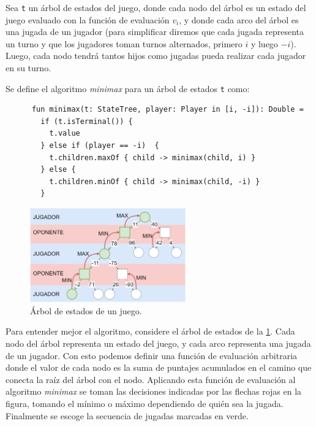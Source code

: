   \begin{definition}
    Sea \texttt{t} un árbol de estados del juego, donde cada nodo del árbol es un estado del juego
    evaluado con la función de evaluación \(v_i\), y donde cada arco del árbol es una jugada de un
    jugador (para simplificar diremos que cada jugada representa un turno y que los jugadores 
    toman turnos alternados, primero \(i\) y luego \(-i\)).
    Luego, cada nodo tendrá tantos hijos como jugadas pueda realizar cada jugador en su turno.

    Se define el algoritmo \textit{minimax} para un árbol de estados \texttt{t} como:
    
    \begin{verbatim}
      fun minimax(t: StateTree, player: Player in [i, -i]): Double =
        if (t.isTerminal()) {
          t.value
        } else if (player == -i)  {
          t.children.maxOf { child -> minimax(child, i) }
        } else {
          t.children.minOf { child -> minimax(child, -i) }
        } 
    \end{verbatim}
  \end{definition}

  
  \begin{figure}[ht!]
    \centering
    \includegraphics[width=0.6\textwidth]{img/minimax.drawio.png}
    \caption{Árbol de estados de un juego.}
    \label{fig:minimax-tree}
  \end{figure}

  Para entender mejor el algoritmo, considere el árbol de estados de la 
  \cref{fig:minimax-tree}.
  Cada nodo del árbol representa un estado del juego, y cada arco representa una jugada de un 
  jugador.
  Con esto podemos definir una función de evaluación arbitraria donde el valor de cada nodo
  es la suma de puntajes acumulados en el camino que conecta la raíz del árbol con el nodo.
  Aplicando esta función de evaluación al algoritmo \textit{minimax} se toman las decisiones
  indicadas por las flechas rojas en la figura, tomando el mínimo o máximo dependiendo de quién
  sea la jugada.
  Finalmente se escoge la secuencia de jugadas marcadas en verde.
  
